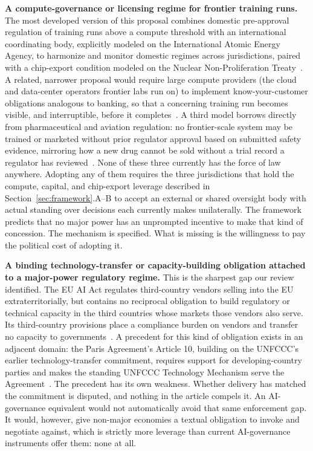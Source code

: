 \documentclass{ieeeaccess}
\begin{document}
\textbf{A compute-governance or licensing regime for frontier training runs.} The most developed version of this proposal combines domestic pre-approval regulation of training runs above a compute threshold with an international coordinating body, explicitly modeled on the International Atomic Energy Agency, to harmonize and monitor domestic regimes across jurisdictions, paired with a chip-export condition modeled on the Nuclear Non-Proliferation Treaty~\cite{belfield2025institutions}. A related, narrower proposal would require large compute providers (the cloud and data-center operators frontier labs run on) to implement know-your-customer obligations analogous to banking, so that a concerning training run becomes visible, and interruptible, before it completes~\cite{egan2023kyc}. A third model borrows directly from pharmaceutical and aviation regulation: no frontier-scale system may be trained or marketed without prior regulator approval based on submitted safety evidence, mirroring how a new drug cannot be sold without a trial record a regulator has reviewed~\cite{salvador2024certified}. None of these three currently has the force of law anywhere. Adopting any of them requires the three jurisdictions that hold the compute, capital, and chip-export leverage described in Section~\ref{sec:framework}.A--B to accept an external or shared oversight body with actual standing over decisions each currently makes unilaterally. The framework predicts that no major power has an unprompted incentive to make that kind of concession. The mechanism is specified. What is missing is the willingness to pay the political cost of adopting it.

\textbf{A binding technology-transfer or capacity-building obligation attached to a major-power regulatory regime.} This is the sharpest gap our review identified. The EU AI Act regulates third-country vendors selling into the EU extraterritorially, but contains no reciprocal obligation to build regulatory or technical capacity in the third countries whose markets those vendors also serve. Its third-country provisions place a compliance burden on vendors and transfer no capacity to governments~\cite{euaiact2024}. A precedent for this kind of obligation exists in an adjacent domain: the Paris Agreement's Article 10, building on the UNFCCC's earlier technology-transfer commitment, requires support for developing-country parties and makes the standing UNFCCC Technology Mechanism serve the Agreement~\cite{unfccc2015parisart10}. The precedent has its own weakness. Whether delivery has matched the commitment is disputed, and nothing in the article compels it. An AI-governance equivalent would not automatically avoid that same enforcement gap. It would, however, give non-major economies a textual obligation to invoke and negotiate against, which is strictly more leverage than current AI-governance instruments offer them: none at all.
\end{document}
